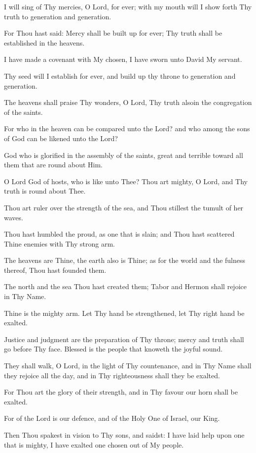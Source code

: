I will sing of Thy mercies, O Lord, for ever; with my mouth will I show forth Thy truth to generation and generation.

For Thou hast said: Mercy shall be built up for ever; Thy truth shall be established in the heavens.

I have made a covenant with My chosen, I have sworn unto David My servant.

Thy seed will I establish for ever, and build up thy throne to generation and generation.

The heavens shall praise Thy wonders, O Lord, Thy truth alsoin the congregation of the saints.

For who in the heaven can be compared unto the Lord? and who among the sons of God can be likened unto the Lord?

God who is glorified in the assembly of the saints, great and terrible toward all them that are round about Him.

O Lord God of hosts, who is like unto Thee? Thou art mighty, O Lord, and Thy truth is round about Thee.

Thou art ruler over the strength of the sea, and Thou stillest the tumult of her waves.

Thou hast humbled the proud, as one that is slain; and Thou hast scattered Thine enemies with Thy strong arm.

The heavens are Thine, the earth also is Thine; as for the world and the fulness thereof, Thou hast founded them.

The north and the sea Thou hast created them; Tabor and Hermon shall rejoice in Thy Name.

Thine is the mighty arm. Let Thy hand be strengthened, let Thy right hand be exalted.

Justice and judgment are the preparation of Thy throne; mercy and truth shall go before Thy face. Blessed is the people that knoweth the joyful sound.

They shall walk, O Lord, in the light of Thy countenance, and in Thy Name shall they rejoice all the day, and in Thy righteousness shall they be exalted.

For Thou art the glory of their strength, and in Thy favour our horn shall be exalted.

For of the Lord is our defence, and of the Holy One of Israel, our King.

Then Thou spakest in vision to Thy sons, and saidst: I have laid help upon one that is mighty, I have exalted one chosen out of My people.

